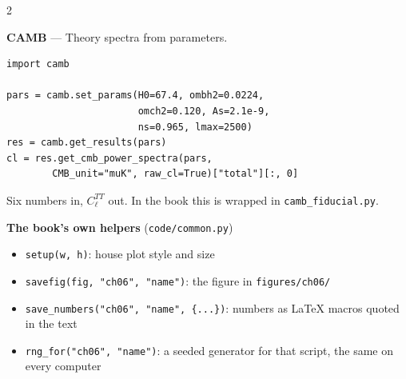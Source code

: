 \documentclass[10pt,a4paper]{article}
\begin{document}
\begin{multicols}{2}
\begin{card}
\textbf{CAMB} --- Theory spectra from parameters.

\begin{lstlisting}[style=pythonstyle]
import camb

pars = camb.set_params(H0=67.4, ombh2=0.0224,
                       omch2=0.120, As=2.1e-9,
                       ns=0.965, lmax=2500)
res = camb.get_results(pars)
cl = res.get_cmb_power_spectra(pars,
        CMB_unit="muK", raw_cl=True)["total"][:, 0]
\end{lstlisting}

Six numbers in, $C_\ell^{TT}$ out. In the book this is wrapped in
\texttt{camb\_fiducial.py}.
\end{card}

\begin{card}
\textbf{The book's own helpers} (\texttt{code/common.py})

\begin{itemize}[leftmargin=*,nosep]
  \item \texttt{setup(w, h)}: house plot style and size
  \item \texttt{savefig(fig, "ch06", "name")}: the figure in \texttt{figures/ch06/}
  \item \texttt{save\_numbers("ch06", "name", \{...\})}: numbers as \LaTeX{} macros quoted in the text
  \item \texttt{rng\_for("ch06", "name")}: a seeded generator for that script, the same on every computer
\end{itemize}
\end{card}

\end{multicols}
\end{document}
